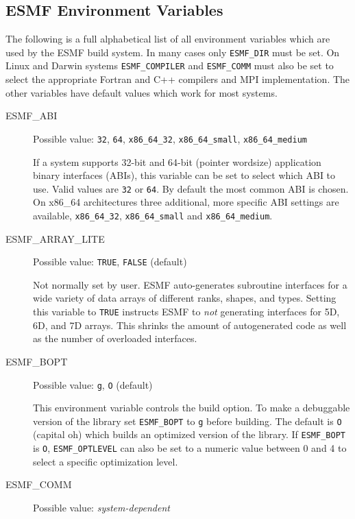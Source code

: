 \subsection{ESMF Environment Variables}
\label{EnvironmentVariables}

The following is a full alphabetical list of all environment variables which
are used by the ESMF build system. In many cases only {\tt ESMF\_DIR} must be
set. On Linux and Darwin systems {\tt ESMF\_COMPILER} and {\tt ESMF\_COMM} must
also be set to select the appropriate Fortran and C++ compilers and MPI
implementation. The other variables have default values which work for
most systems.

\begin{description}

\item[ESMF\_ABI]
Possible value: {\tt 32}, {\tt 64}, {\tt x86\_64\_32}, {\tt x86\_64\_small}, {\tt x86\_64\_medium}

If a system supports 32-bit and 64-bit (pointer wordsize) application binary
interfaces (ABIs), this variable can be set to select which ABI to use. Valid
values are {\tt 32} or {\tt 64}. By default the most common ABI is chosen. On
x86\_64 architectures three additional, more specific ABI settings are available,
{\tt x86\_64\_32}, {\tt x86\_64\_small} and {\tt x86\_64\_medium}.

\item[ESMF\_ARRAY\_LITE]
Possible value: {\tt TRUE}, {\tt FALSE} (default)

Not normally set by user. ESMF auto-generates subroutine interfaces for a wide
variety of data arrays of different ranks, shapes, and types. Setting this
variable to {\tt TRUE} instructs ESMF to {\em not} generating interfaces for
5D, 6D, and 7D arrays. This shrinks the amount of autogenerated code as well
as the number of overloaded interfaces.

\item[ESMF\_BOPT]
Possible value: {\tt g}, {\tt O} (default)

This environment variable controls the build option. To make a debuggable
version of the library set {\tt ESMF\_BOPT} to {\tt g} before building. The
default is {\tt O} (capital oh) which builds an optimized version of the
library. If {\tt ESMF\_BOPT} is {\tt O}, {\tt ESMF\_OPTLEVEL} can also be set
to a numeric value between 0 and 4 to select a specific optimization level.

\item[ESMF\_COMM]
Possible value: {\em system-dependent}


\end{description}
